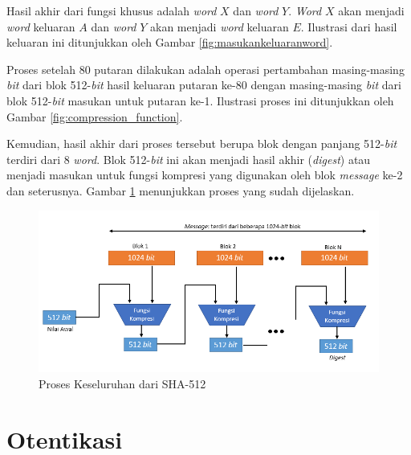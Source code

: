 Hasil akhir dari fungsi khusus adalah \textit{word} \begin{math}X\end{math} dan \textit{word} \begin{math}Y\end{math}. \textit{Word} \begin{math}X\end{math} akan menjadi \textit{word} keluaran \begin{math}A\end{math} dan \textit{word} \begin{math}Y\end{math} akan menjadi \textit{word} keluaran \begin{math}E\end{math}. Ilustrasi dari hasil keluaran ini ditunjukkan oleh Gambar \ref{fig:masukankeluaranword}.

Proses setelah 80 putaran dilakukan adalah operasi pertambahan masing-masing \textit{bit} dari blok 512-\textit{bit} hasil keluaran putaran ke-80 dengan masing-masing \textit{bit} dari blok 512-\textit{bit} masukan untuk putaran ke-1. Ilustrasi proses ini ditunjukkan oleh Gambar \ref{fig:compression_function}. 

Kemudian, hasil akhir dari proses tersebut berupa blok dengan panjang 512-\textit{bit} terdiri dari 8 \textit{word}. Blok 512-\textit{bit} ini akan menjadi hasil akhir (\textit{digest}) atau menjadi masukan untuk fungsi kompresi yang digunakan oleh blok \textit{message} ke-2 dan seterusnya. Gambar \ref{fig:digestcreate} menunjukkan proses yang sudah dijelaskan.

\begin{figure}[H]
	\includegraphics[scale=0.7]{Gambar/digest_creation}
	\caption{Proses Keseluruhan dari SHA-512}\label{fig:digestcreate}
\end{figure}

\section{Otentikasi}


